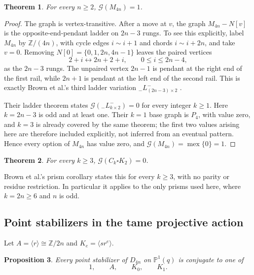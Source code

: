 \documentclass[11pt]{article}
\newtheorem{theorem}{Theorem}[section]
\newtheorem{proposition}[theorem]{Proposition}
\theoremstyle{definition}
\theoremstyle{remark}
\newcommand{\PP}{\mathbb{P}}
\newcommand{\Z}{\mathbb{Z}}
\newcommand{\Grundy}{\mathcal{G}}
\newcommand{\Cyc}{C}
\newcommand{\Mob}{M}
\DeclareMathOperator{\mex}{mex}
\begin{document}
\begin{theorem}
\label{thm:mobius-value}
For every $n\ge2$, $\Grundy(\Mob_{4n})=1$.
\end{theorem}

\begin{proof}
The graph is vertex-transitive. After a move at $v$, the graph $\Mob_{4n}-N[v]$ is the
opposite-end-pendant ladder on $2n-3$ rungs. To see this explicitly, label $\Mob_{4n}$ by $\Z/(4n)$,
with cycle edges $i\sim i+1$ and chords $i\sim i+2n$, and take $v=0$. Removing
$N[0]=\{0,1,2n,4n-1\}$ leaves the paired vertices
\[
  2+i\longleftrightarrow 2n+2+i,\qquad 0\le i\le 2n-4,
\]
as the $2n-3$ rungs. The unpaired vertex $2n-1$ is pendant at the right end of the first rail, while
$2n+1$ is pendant at the left end of the second rail. This is exactly Brown et al.'s third ladder
variation ${}_{-}L^-_{(2n-3)\times2}$ \cite{BrownEtAl2020}.

Their ladder theorem states $\Grundy({}_{-}L^-_{k\times2})=0$ for every integer $k\ge1$. Here
$k=2n-3$ is odd and at least one. Their $k=1$ base graph is $P_4$, with value zero, and $k=3$ is
already covered by the same theorem; the first two values arising here are therefore included
explicitly, not inferred from an eventual pattern. Hence every option of $\Mob_{4n}$ has value zero,
and $\Grundy(\Mob_{4n})=\mex\{0\}=1$.
\end{proof}

\begin{theorem}
\label{thm:prism-value}
For every $k\ge3$, $\Grundy(\Cyc_k\square K_2)=0$.
\end{theorem}

Brown et al.'s prism corollary \cite{BrownEtAl2020} states this for every $k\ge3$, with no parity or
residue restriction. In particular it applies to the only prisms used here, where $k=2n\ge6$ and $n$
is odd.

\subsection{Point stabilizers in the tame projective action}

Let $A=\langle r\rangle\cong \Z/2n$ and $K_e=\langle sr^e\rangle$.

\begin{proposition}
\label{prop:stabilizers}
Every point stabilizer of $D_{4n}$ on $\PP^1(q)$ is conjugate to one of
\begin{equation}
  1,\qquad A,\qquad K_0,\qquad K_1 .
  \label{eq:stabilizers}
\end{equation}
\end{proposition}
\end{document}
